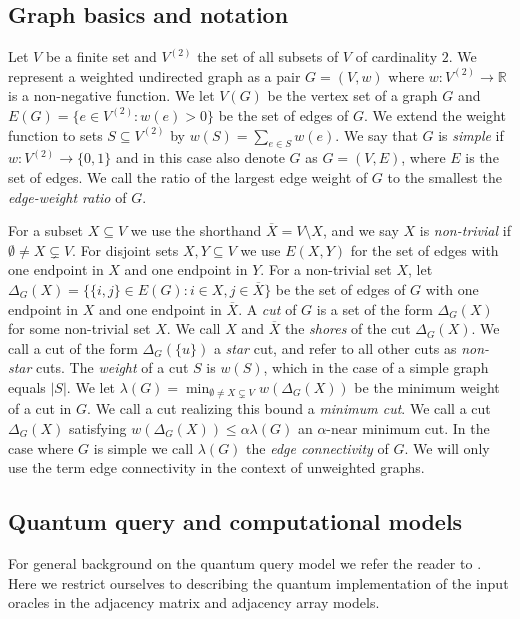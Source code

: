 \documentclass[10pt,a4paper]{article}
\newcommand{\R}{\mathbb{R}}
\newcommand{\1}{\mathbf{1}}
\theoremstyle{definition}
\begin{document}
\subsection{Graph basics and notation}
Let $V$ be a finite set and $V^{(2)}$ the set of all subsets of $V$ of cardinality $2$.  We represent a weighted undirected 
graph as a pair $G = (V,w)$ where $w: V^{(2)} \rightarrow \R$ is a non-negative function.  We let $V(G)$ be the vertex set of a graph $G$ and 
$E(G) = \{ e \in V^{(2)}: w(e) > 0\}$ be the set of edges of $G$.  We extend the weight function to sets $S \subseteq V^{(2)}$ by $w(S) = \sum_{e \in S} w(e)$.
We say that $G$ is \emph{simple} if $w: V^{(2)} \rightarrow \{0,1\}$ and in this case also denote $G$ as $G = (V,E)$, where $E$ is the set of edges.  We call the 
ratio of the largest edge weight of $G$ to the smallest the \emph{edge-weight ratio} of $G$.


For a subset $X \subseteq V$ we use the shorthand $\overline{X} = V \setminus X$, and we say $X$ is \emph{non-trivial} if $\emptyset \ne X \subsetneq V$.  
For disjoint sets $X,Y \subseteq V$ we use $E(X,Y)$ for the set of edges with one endpoint in $X$ and one endpoint in $Y$.
For a non-trivial set $X$, let $\Delta_G(X) = \{ \{i,j\} \in E(G) : i \in X, j \in \overline{X}\}$ be the set of edges 
of $G$ with one endpoint in $X$ and one endpoint in $\overline{X}$.  A \emph{cut} of $G$ is a set of the form $\Delta_G(X)$ for some non-trivial 
set $X$.  We call $X$ and $\overline{X}$ the \emph{shores} of the cut $\Delta_G(X)$.  We call a cut of the form $\Delta_G(\{u\})$ a \emph{star} cut, and refer 
to all other cuts as \emph{non-star} cuts.  The \emph{weight} of a cut $S$ is $w(S)$, which in the 
case of a simple graph equals $|S|$.  We let $\lambda(G) = \min_{\emptyset \ne X \subsetneq V} w(\Delta_G(X))$ be the minimum weight of a cut in $G$.  
We call a cut realizing this bound a \emph{minimum cut}.  We call a cut $\Delta_G(X)$ satisfying $w(\Delta_G(X)) \le \alpha \lambda(G)$ an $\alpha$-near minimum cut. 
In the case where $G$ is simple we call $\lambda(G)$ the \emph{edge connectivity} of $G$.  
We will only use the term edge connectivity in the context of unweighted graphs.



\setcounter{subsection}{2}
\subsection{Quantum query and computational models}
For general background on the quantum query model we refer the reader to \cite{HLS07}. 
Here we restrict ourselves to describing the quantum 
implementation of the input oracles in the adjacency matrix and adjacency array models.
\end{document}
